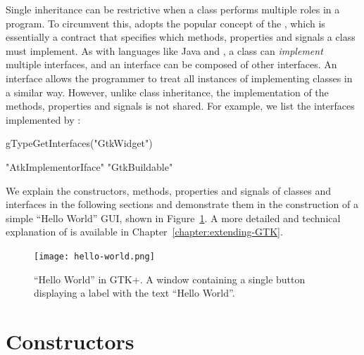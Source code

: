 Single inheritance can be restrictive when a class performs multiple
roles in a program. To circumvent this, \GTK\/ adopts the popular
concept of the , which is essentially a contract
that specifies which methods, properties and signals a class must
implement. As with languages like Java and , a class can
\textit{implement} multiple interfaces, and an interface can be
composed of other interfaces. An interface allows the programmer to
treat all instances of implementing classes in a similar way. However,
unlike class inheritance, the implementation of the methods,
properties and signals is not shared. For example, we list the
interfaces implemented by :
\begin{Schunk}
\begin{Sinput}
 gTypeGetInterfaces("GtkWidget")
\end{Sinput}
\begin{Soutput}
[1] "AtkImplementorIface" "GtkBuildable"       
\end{Soutput}
\end{Schunk}

We explain the constructors, methods, properties and signals of
classes and interfaces in the following sections and demonstrate them
in the construction of a simple ``Hello World'' GUI, shown in
Figure~\ref{fig:hello-world}. A more detailed and technical
explanation of  is available in
Chapter~\ref{chapter:extending-GTK}.

\begin{figure}[h!tbp]
  \begin{center}
    \texttt{[image: hello-world.png]}
    \caption{\label{fig:hello-world}``Hello World'' in GTK+. 
      A window containing a single button displaying a label with the text
      ``Hello World''.}
  \end{center}
\end{figure}

\section{Constructors}

